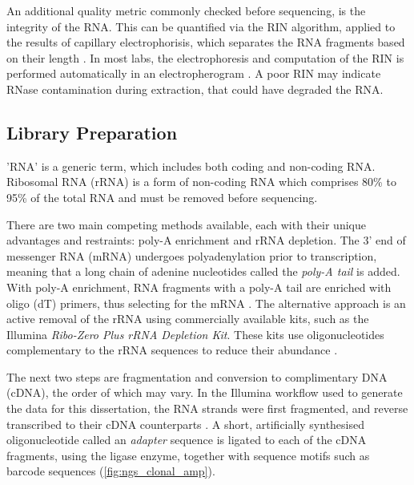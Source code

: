 An additional quality metric commonly checked before sequencing, is the integrity of the RNA. This can be quantified via the \ac{RIN} algorithm, applied to the results of capillary electrophorisis, which separates the RNA fragments based on their length \citep{schroeder2006rin}. In most labs, the electrophoresis and computation of the \ac{RIN} is performed automatically in an electropherogram \citep{chamieh2015quantitative}. A poor \ac{RIN} may indicate RNase contamination during extraction, that could have degraded the RNA.

\subsection{Library Preparation}
'RNA' is a generic term, which includes both coding and non-coding RNA. Ribosomal RNA (rRNA) is a form of non-coding RNA which comprises 80\% to 95\% of the total RNA \citep{o2013ribosomal, kukurba2015rna} and must be removed before sequencing. 

There are two main competing methods available, each with their unique advantages and restraints: poly-A enrichment and rRNA depletion. The 3' end of messenger RNA (mRNA) undergoes polyadenylation prior to transcription, meaning that a long chain of adenine nucleotides called the \textit{poly-A tail} is added. With poly-A enrichment, RNA fragments with a poly-A tail are enriched with oligo (dT) primers, thus selecting for the mRNA \citep{zhao2014comparison}. The alternative approach is an active removal of the rRNA using commercially available kits, such as the Illumina \textit{Ribo-Zero Plus rRNA Depletion Kit}. These kits use oligonucleotides complementary to the rRNA sequences to reduce their abundance \citep{griffith2015informatics, peano2013efficient}. 

The next two steps are fragmentation and conversion to complimentary DNA (cDNA), the order of which may vary. In the Illumina workflow used to generate the data for this dissertation, the RNA strands were first fragmented, and reverse transcribed to their cDNA counterparts \citep{pease2012rapid}. A short, artificially synthesised oligonucleotide called an \textit{adapter} sequence is ligated to each of the cDNA fragments, using the ligase enzyme, together with sequence motifs such as barcode sequences \citep{pease2012rapid} (\autoref{fig:ngs_clonal_amp}).


